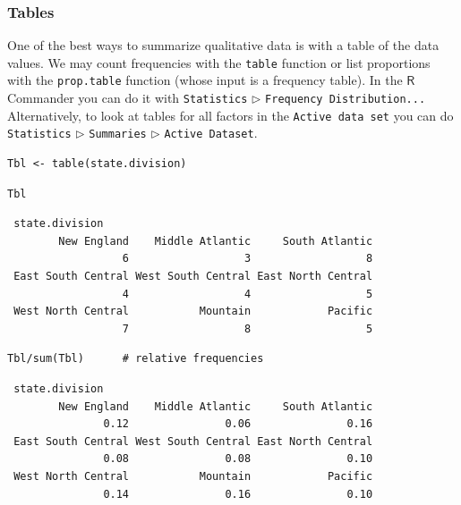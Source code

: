 \documentclass[captions=tableheading]{scrbook}
\begin{document}
\subsubsection{Tables}
\label{sec-3-1-4-1}
\label{par:Tables}


One of the best ways to summarize qualitative data is with a table of the data values. We may count frequencies with the \texttt{table} function or list proportions with the \texttt{prop.table} function (whose input is a frequency table). In the \(\mathsf{R}\) Commander you can do it with \texttt{Statistics} \(\triangleright\) \texttt{Frequency Distribution...} Alternatively, to look at tables for all factors in the \texttt{Active data set} you can do \texttt{Statistics} \(\triangleright\) \texttt{Summaries} \(\triangleright\) \texttt{Active Dataset}.


\lstset{language=R}
\begin{lstlisting}
Tbl <- table(state.division)
\end{lstlisting}


\lstset{language=R}
\begin{lstlisting}
Tbl
\end{lstlisting}

\begin{verbatim}
 state.division
        New England    Middle Atlantic     South Atlantic 
                  6                  3                  8 
 East South Central West South Central East North Central 
                  4                  4                  5 
 West North Central           Mountain            Pacific 
                  7                  8                  5
\end{verbatim}


\lstset{language=R}
\begin{lstlisting}
Tbl/sum(Tbl)      # relative frequencies
\end{lstlisting}

\begin{verbatim}
 state.division
        New England    Middle Atlantic     South Atlantic 
               0.12               0.06               0.16 
 East South Central West South Central East North Central 
               0.08               0.08               0.10 
 West North Central           Mountain            Pacific 
               0.14               0.16               0.10
\end{verbatim}
\end{document}
